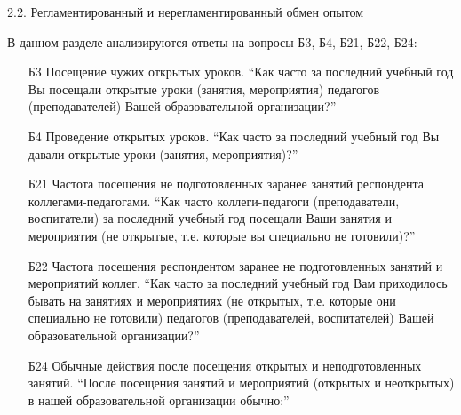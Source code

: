 \begin{frame}{2.2. Регламентированный и нерегламентированный обмен опытом}

\tiny

В данном разделе анализируются ответы на вопросы Б3, Б4, Б21, Б22, Б24:
\bigskip

\begin{itemize}

\item [Б3] Посещение чужих открытых уроков. ``Как часто за последний учебный год Вы посещали открытые уроки (занятия, мероприятия) педагогов (преподавателей)  Вашей образовательной организации?''

\item [Б4] Проведение открытых уроков. ``Как часто за последний учебный год Вы давали открытые уроки (занятия, мероприятия)?''

\item [Б21] Частота посещения не подготовленных заранее занятий респондента коллегами-педагогами. ``Как часто коллеги-педагоги (преподаватели, воспитатели) за последний учебный год посещали Ваши занятия и мероприятия (не открытые, т.е. которые вы специально не готовили)?''

\item [Б22] Частота посещения респондентом заранее не подготовленных занятий и мероприятий коллег. ``Как часто за последний учебный год Вам приходилось бывать на занятиях и мероприятиях (не открытых, т.е. которые они специально не готовили) педагогов (преподавателей, воспитателей) Вашей образовательной организации?''

\item [Б24] Обычные действия после посещения открытых и неподготовленных занятий. ``После посещения занятий  и мероприятий (открытых и неоткрытых)  в нашей образовательной организации  обычно:''

\end{itemize}

\end{frame}


